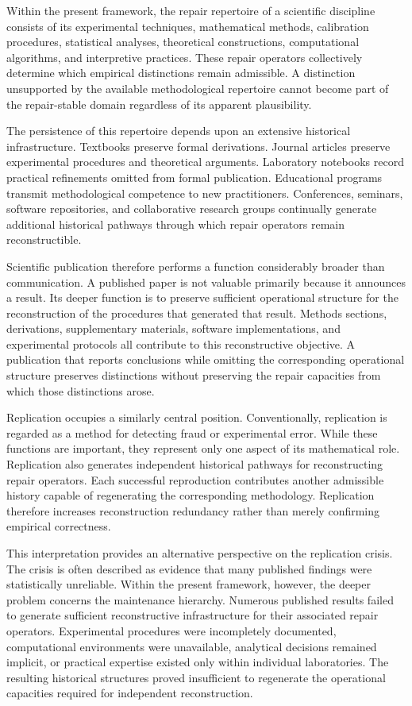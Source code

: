 \documentclass[12pt,oneside]{article}
\theoremstyle{plain}
\theoremstyle{definition}
\theoremstyle{remark}
\theoremstyle{plain}
\begin{document}
Within the present framework, the repair repertoire of a scientific discipline consists of its
experimental techniques, mathematical methods, calibration procedures, statistical analyses,
theoretical constructions, computational algorithms, and interpretive practices. These repair
operators collectively determine which empirical distinctions remain admissible. A distinction
unsupported by the available methodological repertoire cannot become part of the repair-stable
domain regardless of its apparent plausibility.

The persistence of this repertoire depends upon an extensive historical infrastructure. Textbooks
preserve formal derivations. Journal articles preserve experimental procedures and theoretical
arguments. Laboratory notebooks record practical refinements omitted from formal publication.
Educational programs transmit methodological competence to new practitioners. Conferences,
seminars, software repositories, and collaborative research groups continually generate additional
historical pathways through which repair operators remain reconstructible.

Scientific publication therefore performs a function considerably broader than communication. A
published paper is not valuable primarily because it announces a result. Its deeper function is to
preserve sufficient operational structure for the reconstruction of the procedures that generated
that result. Methods sections, derivations, supplementary materials, software implementations, and
experimental protocols all contribute to this reconstructive objective. A publication that reports
conclusions while omitting the corresponding operational structure preserves distinctions without
preserving the repair capacities from which those distinctions arose.

Replication occupies a similarly central position. Conventionally, replication is regarded as a
method for detecting fraud or experimental error. While these functions are important, they
represent only one aspect of its mathematical role. Replication also generates independent
historical pathways for reconstructing repair operators. Each successful reproduction contributes
another admissible history capable of regenerating the corresponding methodology. Replication
therefore increases reconstruction redundancy rather than merely confirming empirical correctness.

This interpretation provides an alternative perspective on the replication crisis. The crisis is
often described as evidence that many published findings were statistically unreliable. Within the
present framework, however, the deeper problem concerns the maintenance hierarchy. Numerous
published results failed to generate sufficient reconstructive infrastructure for their associated
repair operators. Experimental procedures were incompletely documented, computational environments
were unavailable, analytical decisions remained implicit, or practical expertise existed only within
individual laboratories. The resulting historical structures proved insufficient to regenerate the
operational capacities required for independent reconstruction.
\end{document}
